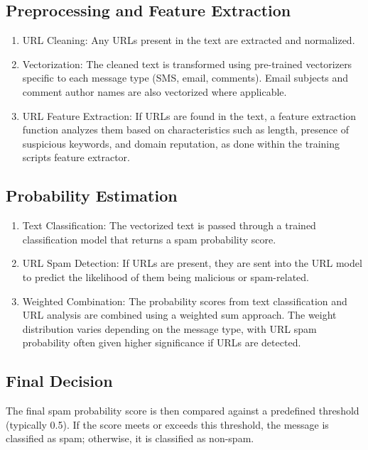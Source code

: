 \documentclass{article}
\begin{document}
\subsection{Preprocessing and Feature Extraction}

\begin{enumerate}
    \item URL Cleaning: Any URLs present in the text are extracted and normalized.
    \item Vectorization: The cleaned text is transformed using pre-trained vectorizers specific to each message type (SMS, email, comments). Email subjects and comment author names are also vectorized where applicable.
    \item URL Feature Extraction: If URLs are found in the text, a feature extraction function analyzes them based on characteristics such as length, presence of suspicious keywords, and domain reputation, as done within the training scripts feature extractor.
\end{enumerate}

\subsection{Probability Estimation}

\begin{enumerate}
    \item Text Classification: The vectorized text is passed through a trained classification model that returns a spam probability score.
    \item URL Spam Detection: If URLs are present, they are sent into the URL model to predict the likelihood of them being malicious or spam-related.
    \item Weighted Combination: The probability scores from text classification and URL analysis are combined using a weighted sum approach. The weight distribution varies depending on the message type, with URL spam probability often given higher significance if URLs are detected.
\end{enumerate}

\subsection{Final Decision}

The final spam probability score is then compared against a predefined threshold (typically 0.5). If the score meets or exceeds this threshold, the message is classified as spam; otherwise, it is classified as non-spam.
\end{document}
